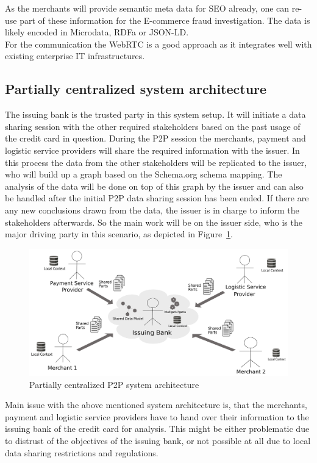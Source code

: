 As the merchants will provide semantic meta data for \gls{SEO} already, one can re-use part of these information for the E-commerce fraud investigation. The data is likely encoded in Microdata, \gls{RDFa} or \gls{JSON-LD}. \\

For the communication the \gls{WebRTC} is a good approach as it integrates well with existing enterprise IT infrastructures.


\subsection{Partially centralized system architecture}
\label{subsec:p2p_partially_centralized_system}

The issuing bank is the trusted party in this system setup. It will initiate a data sharing session with the other required stakeholders based on the past usage of the credit card in question. During the P2P session the merchants, payment and logistic service providers will share the required information with the issuer. In this process the data from the other stakeholders will be replicated to the issuer, who will build up a graph based on the Schema.org schema mapping. The analysis of the data will be done on top of this graph by the issuer and can also be handled after the initial P2P data sharing session has been ended. If there are any new conclusions drawn from the data, the issuer is in charge to inform the stakeholders afterwards. So the main work will be on the issuer side, who is the major driving party in this scenario, as depicted in Figure~\ref{fig:images_p2p_centralized}.\@

\begin{figure}[H]
	\centering
		\includegraphics[width=0.8\columnwidth]{images/system_P2P_centralized.pdf}
	\caption{Partially centralized \gls{P2P} system architecture}
\label{fig:images_p2p_centralized}
\end{figure}

Main issue with the above mentioned system architecture is, that the merchants, payment and logistic service providers have to hand over their information to the issuing bank of the credit card for analysis. This might be either problematic due to distrust of the objectives of the issuing bank, or not possible at all due to local data sharing restrictions and regulations.


